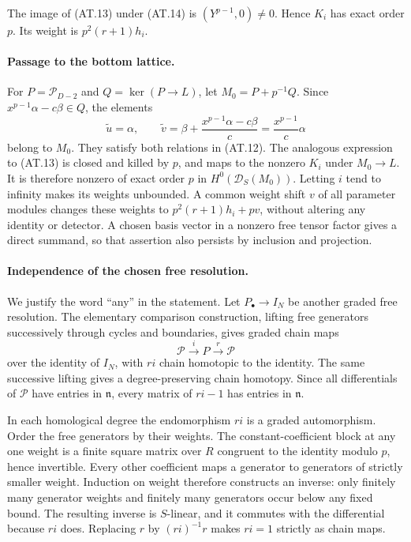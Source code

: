 The image of (AT.13) under (AT.14) is
\((Y^{p-1},0)\neq0\). Hence \(K_i\) has exact order
\(p\). Its weight is \(p^2(r+1)h_i\).

\paragraph{Passage to the bottom lattice.}
For \(P=\mathcal P_{D-2}\) and \(Q=\ker(P\to L)\),
let \(M_0=P+p^{-1}Q\). Since
\(x^{p-1}\alpha-c\beta\in Q\), the elements
\[
 \widetilde u=\alpha,\qquad
 \widetilde v=\beta+
          \frac{x^{p-1}\alpha-c\beta}{c}
                   =\frac{x^{p-1}}c\alpha               \tag{AT.15}
\]
belong to \(M_0\). They satisfy both relations in (AT.12).
The analogous expression to (AT.13) is closed and killed
by \(p\), and maps to the nonzero \(K_i\) under
\(M_0\to L\). It is therefore nonzero of exact order
\(p\) in \(H^0(\mathscr D_S(M_0))\).
Letting \(i\) tend to infinity makes its weights unbounded.
A common weight shift \(v\) of all parameter modules changes
these weights to \(p^2(r+1)h_i+pv\), without altering any
identity or detector. A chosen basis vector in a nonzero free
tensor factor gives a direct summand, so that assertion also
persists by inclusion and projection.

\paragraph{Independence of the chosen free resolution.}
We justify the word ``any'' in the statement. Let
\(P_\bullet\to I_N\) be another graded free resolution.
The elementary comparison construction, lifting free
generators successively through cycles and boundaries, gives
graded chain maps
\[
 \mathcal P\xrightarrow{\ i\ }P
       \xrightarrow{\ r\ }\mathcal P
\]
over the identity of \(I_N\), with
\(ri\) chain homotopic to the identity. The same successive
lifting gives a degree-preserving chain homotopy. Since all
differentials of \(\mathcal P\) have entries in
\(\mathfrak n\), every matrix of \(ri-1\) has entries
in \(\mathfrak n\).

In each homological degree the endomorphism \(ri\) is a
graded automorphism. Order the free generators by their weights.
The constant-coefficient block at any one weight is a finite
square matrix over \(R\) congruent to the identity modulo
\(p\), hence invertible. Every other coefficient maps a
generator to generators of strictly smaller weight. Induction
on weight therefore constructs an inverse: only finitely many
generator weights and finitely many generators occur below
any fixed bound. The resulting inverse is \(S\)-linear,
and it commutes with the differential because \(ri\) does.
Replacing \(r\) by \((ri)^{-1}r\) makes
\(ri=1\) strictly as chain maps.


